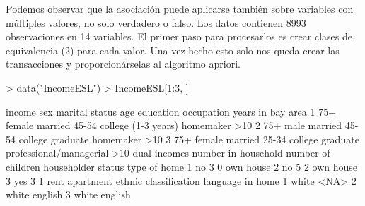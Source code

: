 \documentclass [a4paper] {article}
\begin{document}
Podemos observar que la asociación puede aplicarse también sobre variables con múltiples valores, no solo verdadero o falso.
Los datos contienen 8993 observaciones en 14 variables. El primer paso para procesarlos es crear clases de equivalencia (2) para cada valor.
Una vez hecho esto solo nos queda crear las transacciones y proporcionárselas al algoritmo apriori.

\begin{Schunk}
\begin{Sinput}
> data("IncomeESL")
> IncomeESL[1:3, ]
\end{Sinput}
\begin{Soutput}
  income    sex marital status   age           education              occupation years in bay area
1    75+ female        married 45-54 college (1-3 years)               homemaker               >10
2    75+   male        married 45-54    college graduate               homemaker               >10
3    75+ female        married 25-34    college graduate professional/managerial               >10
  dual incomes number in household number of children householder status type of home
1           no                   3                  0                own        house
2           no                   5                  2                own        house
3          yes                   3                  1               rent    apartment
  ethnic classification language in home
1                 white             <NA>
2                 white          english
3                 white          english
\end{Soutput}
\end{Schunk}
\end{document}
